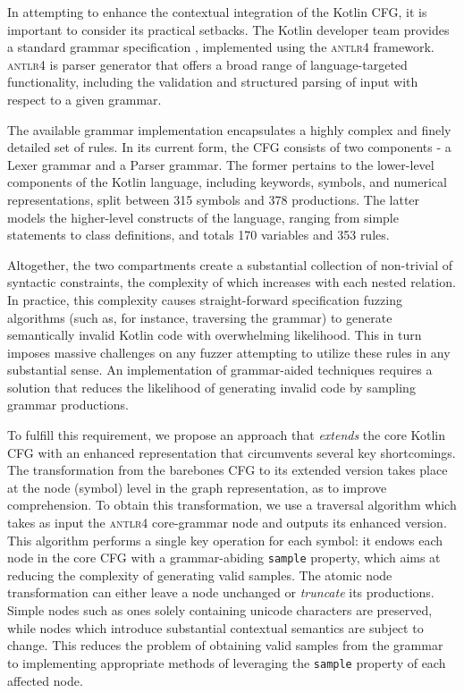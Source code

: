 In attempting to enhance the contextual integration of the Kotlin \gls{CFG},
it is important to consider its practical setbacks.
The Kotlin developer team provides a standard grammar specification \cite{kotlingrammar},
implemented using the \textsc{antlr4} framework.
\textsc{antlr4} \cite{parr2013definitive} is parser generator that
offers a broad range of language-targeted functionality,
including the validation and structured parsing of input
with respect to a given grammar.

The available grammar implementation encapsulates a highly complex 
and finely detailed set of rules.
In its current form, the \gls{CFG} consists of two components - a Lexer grammar
and a Parser grammar.
The former pertains to the lower-level components of the Kotlin language, 
including keywords, symbols, and numerical representations, split between 315 
symbols and 378 productions.
The latter models the higher-level constructs of the language, ranging from
simple statements to class definitions, and totals 170 variables and 353 rules.

Altogether, the two compartments create a substantial collection of non-trivial
of syntactic constraints, the complexity of which increases with each nested
relation.
In practice, this complexity causes straight-forward specification fuzzing algorithms
(such as, for instance, traversing the grammar)
to generate semantically invalid Kotlin code with overwhelming likelihood.
This in turn imposes massive challenges on any fuzzer attempting to utilize these
rules in any substantial sense.
An implementation of grammar-aided techniques requires a
solution that reduces the likelihood of generating invalid code by sampling grammar productions.

To fulfill this requirement, we propose an approach that \textit{extends} the core
Kotlin \gls{CFG} with an enhanced representation that circumvents several key shortcomings.
The transformation from the barebones \gls{CFG} to its extended version takes place
at the node (symbol) level in  the graph representation, as to improve comprehension.
To obtain this transformation, we use a traversal algorithm which takes as input the
\textsc{antlr4} core-grammar node and outputs its enhanced version.
This algorithm performs a single key operation for each symbol:
it endows each node in the core \gls{CFG} with a grammar-abiding \texttt{sample} property,
which aims at reducing the complexity of generating valid samples.
The atomic node transformation can either leave a node unchanged or \textit{truncate} its
productions.
Simple nodes such as ones solely containing unicode characters are preserved, while
nodes which introduce substantial contextual semantics are subject to change.
This reduces the problem of obtaining valid samples from the grammar to implementing
appropriate methods of leveraging the \texttt{sample} property of each affected node.


